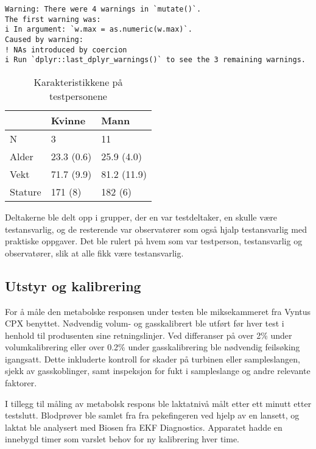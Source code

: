\documentclass[
  letterpaper,
  DIV=11,
  numbers=noendperiod]{scrreprt}
\begin{document}
\begin{verbatim}
Warning: There were 4 warnings in `mutate()`.
The first warning was:
i In argument: `w.max = as.numeric(w.max)`.
Caused by warning:
! NAs introduced by coercion
i Run `dplyr::last_dplyr_warnings()` to see the 3 remaining warnings.
\end{verbatim}

\begin{longtable}[]{@{}lll@{}}

\caption{\label{tbl-testantro}Karakteristikkene på testpersonene}

\tabularnewline

\toprule\noalign{}
& Kvinne & Mann \\
\midrule\noalign{}
\endhead
\bottomrule\noalign{}
\endlastfoot
N & 3 & 11 \\
Alder & 23.3 (0.6) & 25.9 (4.0) \\
Vekt & 71.7 (9.9) & 81.2 (11.9) \\
Stature & 171 (8) & 182 (6) \\

\end{longtable}

Deltakerne ble delt opp i grupper, der en var testdeltaker, en skulle
være testansvarlig, og de resterende var observatører som også hjalp
testansvarlig med praktiske oppgaver. Det ble rulert på hvem som var
testperson, testansvarlig og observatører, slik at alle fikk være
testansvarlig.

\subsection{Utstyr og kalibrering}\label{utstyr-og-kalibrering}

For å måle den metabolske responsen under testen ble miksekammeret fra
Vyntus CPX benyttet. Nødvendig volum- og gasskalibrert ble utført før
hver test i henhold til produsenten sine retningslinjer. Ved differanser
på over 2\% under volumkalibrering eller over 0.2\% under
gasskalibrering ble nødvendig feilsøking igangsatt. Dette inkluderte
kontroll for skader på turbinen eller sampleslangen, sjekk av
gasskoblinger, samt inspeksjon for fukt i sampleslange og andre
relevante faktorer.

I tillegg til måling av metabolsk respons ble laktatnivå målt etter ett
minutt etter testslutt. Blodprøver ble samlet fra fra pekefingeren ved
hjelp av en lansett, og laktat ble analysert med Biosen fra EKF
Diagnostics. Apparatet hadde en innebygd timer som varslet behov for ny
kalibrering hver time.
\end{document}
